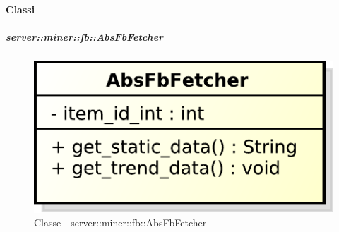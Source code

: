 	\paragraph{Classi} %
		\subparagraph{server::miner::fb::AbsFbFetcher} %
		\label{subp:server_miner_fb_AbsFbFetcher}
		    \begin{figure}[!htbp]
 		 		\centering
 				\centerline{\includegraphics[scale=0.75]{./images/server/classes/miner/abs_fb_fetcher.pdf}}
 				\caption{Classe - server::miner::fb::AbsFbFetcher}
			\end{figure}
